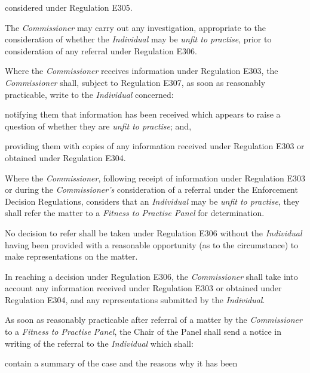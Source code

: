 considered under Regulation E305.\\
\par
The \emph{Commissioner} may carry out any investigation, appropriate to
the consideration of whether the \emph{Individual} may be \emph{unfit to
practise}, prior to consideration of any referral under Regulation
E306.\\
\par
Where  the \emph{Commissioner} receives information under Regulation
E303, the \emph{Commissioner} shall, subject to Regulation E307, as soon
as reasonably practicable, write to the \emph{Individual} concerned:\\\nl \item notifying them that information has been received which appears to
raise a question of whether they are \emph{unfit to practise}; and,\item providing them with copies of any information received under
Regulation E303 or obtained under Regulation E304.\ln
{}\par
Where the \emph{Commissioner}, following receipt of information under
Regulation E303 or during the \emph{Commissioner's} consideration of a
referral under the Enforcement Decision Regulations, considers that
an \emph{Individual} may be \emph{unfit to practise}, they shall refer
the matter to a \emph{Fitness to Practise Panel} for determination.\\
\par
No decision to refer shall be taken under Regulation E306 without
the \emph{Individual} having been provided with a reasonable opportunity
(as to the circumstance) to make representations on the matter.\\
\par
In reaching a decision under Regulation E306,
the \emph{Commissioner} shall take into account any information received
under Regulation E303 or obtained under Regulation E304, and any
representations submitted by the \emph{Individual}.\\
\par
{}
As soon as reasonably practicable after referral of a matter by
the \emph{Commissioner} to a \emph{Fitness to Practise Panel}, the Chair
of the Panel shall send a notice in writing of the referral to
the \emph{Individual} which shall:\\\nl \item contain a summary of the case and the reasons why it has been
